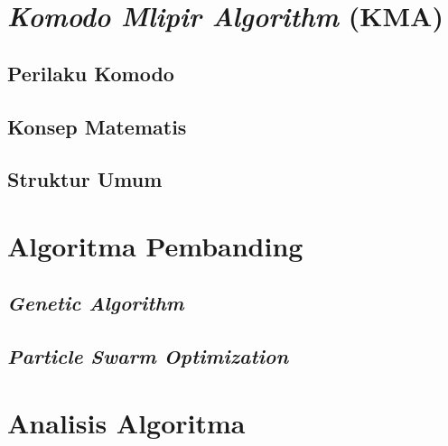     \section{\textit{Komodo Mlipir Algorithm} (KMA)}\label{sec:kma}

        \subsection{Perilaku Komodo}\label{subsec:komodo behaviour}

        \subsection{Konsep Matematis}\label{subsec:kma math}

        \subsection{Struktur Umum}\label{subsec:kma structure}

    \section{Algoritma Pembanding}\label{sec:comparators}

        \subsection{\textit{Genetic Algorithm}}\label{subsec:ga}

        \subsection{\textit{Particle Swarm Optimization}}\label{subsec:pso}

    \section{Analisis Algoritma}\label{sec:algorithm analysis}
